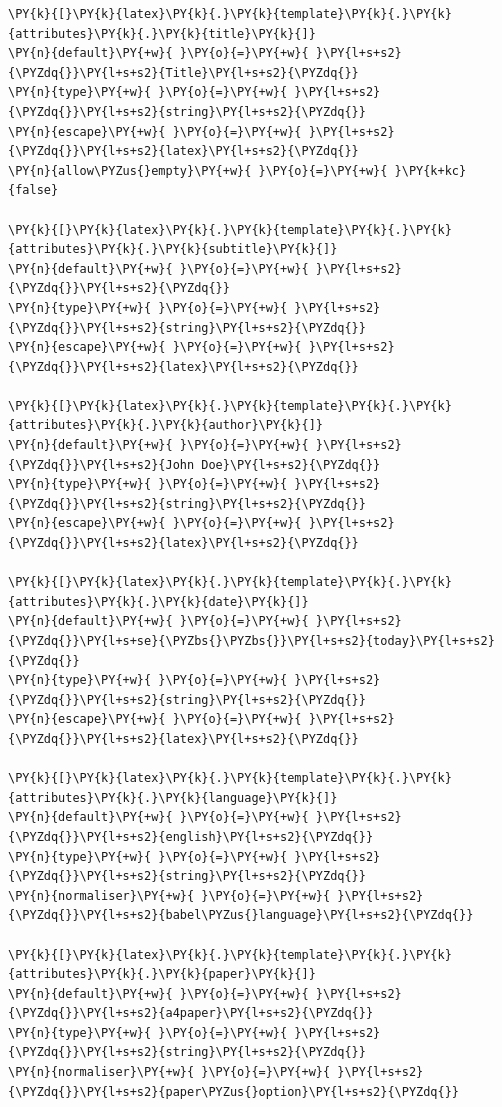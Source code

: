 \documentclass[a4paper,twoside]{article}
\begin{document}
\begin{tscode}[lang=toml, engine=pygments]
\begin{Verbatim}[commandchars=\\\{\},breaklines, breakanywhere, commandchars=\\\{\}]
\PY{k}{[}\PY{k}{latex}\PY{k}{.}\PY{k}{template}\PY{k}{.}\PY{k}{attributes}\PY{k}{.}\PY{k}{title}\PY{k}{]}
\PY{n}{default}\PY{+w}{ }\PY{o}{=}\PY{+w}{ }\PY{l+s+s2}{\PYZdq{}}\PY{l+s+s2}{Title}\PY{l+s+s2}{\PYZdq{}}
\PY{n}{type}\PY{+w}{ }\PY{o}{=}\PY{+w}{ }\PY{l+s+s2}{\PYZdq{}}\PY{l+s+s2}{string}\PY{l+s+s2}{\PYZdq{}}
\PY{n}{escape}\PY{+w}{ }\PY{o}{=}\PY{+w}{ }\PY{l+s+s2}{\PYZdq{}}\PY{l+s+s2}{latex}\PY{l+s+s2}{\PYZdq{}}
\PY{n}{allow\PYZus{}empty}\PY{+w}{ }\PY{o}{=}\PY{+w}{ }\PY{k+kc}{false}

\PY{k}{[}\PY{k}{latex}\PY{k}{.}\PY{k}{template}\PY{k}{.}\PY{k}{attributes}\PY{k}{.}\PY{k}{subtitle}\PY{k}{]}
\PY{n}{default}\PY{+w}{ }\PY{o}{=}\PY{+w}{ }\PY{l+s+s2}{\PYZdq{}}\PY{l+s+s2}{\PYZdq{}}
\PY{n}{type}\PY{+w}{ }\PY{o}{=}\PY{+w}{ }\PY{l+s+s2}{\PYZdq{}}\PY{l+s+s2}{string}\PY{l+s+s2}{\PYZdq{}}
\PY{n}{escape}\PY{+w}{ }\PY{o}{=}\PY{+w}{ }\PY{l+s+s2}{\PYZdq{}}\PY{l+s+s2}{latex}\PY{l+s+s2}{\PYZdq{}}

\PY{k}{[}\PY{k}{latex}\PY{k}{.}\PY{k}{template}\PY{k}{.}\PY{k}{attributes}\PY{k}{.}\PY{k}{author}\PY{k}{]}
\PY{n}{default}\PY{+w}{ }\PY{o}{=}\PY{+w}{ }\PY{l+s+s2}{\PYZdq{}}\PY{l+s+s2}{John Doe}\PY{l+s+s2}{\PYZdq{}}
\PY{n}{type}\PY{+w}{ }\PY{o}{=}\PY{+w}{ }\PY{l+s+s2}{\PYZdq{}}\PY{l+s+s2}{string}\PY{l+s+s2}{\PYZdq{}}
\PY{n}{escape}\PY{+w}{ }\PY{o}{=}\PY{+w}{ }\PY{l+s+s2}{\PYZdq{}}\PY{l+s+s2}{latex}\PY{l+s+s2}{\PYZdq{}}

\PY{k}{[}\PY{k}{latex}\PY{k}{.}\PY{k}{template}\PY{k}{.}\PY{k}{attributes}\PY{k}{.}\PY{k}{date}\PY{k}{]}
\PY{n}{default}\PY{+w}{ }\PY{o}{=}\PY{+w}{ }\PY{l+s+s2}{\PYZdq{}}\PY{l+s+se}{\PYZbs{}\PYZbs{}}\PY{l+s+s2}{today}\PY{l+s+s2}{\PYZdq{}}
\PY{n}{type}\PY{+w}{ }\PY{o}{=}\PY{+w}{ }\PY{l+s+s2}{\PYZdq{}}\PY{l+s+s2}{string}\PY{l+s+s2}{\PYZdq{}}
\PY{n}{escape}\PY{+w}{ }\PY{o}{=}\PY{+w}{ }\PY{l+s+s2}{\PYZdq{}}\PY{l+s+s2}{latex}\PY{l+s+s2}{\PYZdq{}}

\PY{k}{[}\PY{k}{latex}\PY{k}{.}\PY{k}{template}\PY{k}{.}\PY{k}{attributes}\PY{k}{.}\PY{k}{language}\PY{k}{]}
\PY{n}{default}\PY{+w}{ }\PY{o}{=}\PY{+w}{ }\PY{l+s+s2}{\PYZdq{}}\PY{l+s+s2}{english}\PY{l+s+s2}{\PYZdq{}}
\PY{n}{type}\PY{+w}{ }\PY{o}{=}\PY{+w}{ }\PY{l+s+s2}{\PYZdq{}}\PY{l+s+s2}{string}\PY{l+s+s2}{\PYZdq{}}
\PY{n}{normaliser}\PY{+w}{ }\PY{o}{=}\PY{+w}{ }\PY{l+s+s2}{\PYZdq{}}\PY{l+s+s2}{babel\PYZus{}language}\PY{l+s+s2}{\PYZdq{}}

\PY{k}{[}\PY{k}{latex}\PY{k}{.}\PY{k}{template}\PY{k}{.}\PY{k}{attributes}\PY{k}{.}\PY{k}{paper}\PY{k}{]}
\PY{n}{default}\PY{+w}{ }\PY{o}{=}\PY{+w}{ }\PY{l+s+s2}{\PYZdq{}}\PY{l+s+s2}{a4paper}\PY{l+s+s2}{\PYZdq{}}
\PY{n}{type}\PY{+w}{ }\PY{o}{=}\PY{+w}{ }\PY{l+s+s2}{\PYZdq{}}\PY{l+s+s2}{string}\PY{l+s+s2}{\PYZdq{}}
\PY{n}{normaliser}\PY{+w}{ }\PY{o}{=}\PY{+w}{ }\PY{l+s+s2}{\PYZdq{}}\PY{l+s+s2}{paper\PYZus{}option}\PY{l+s+s2}{\PYZdq{}}


\end{Verbatim}
\end{tscode}
\end{document}

